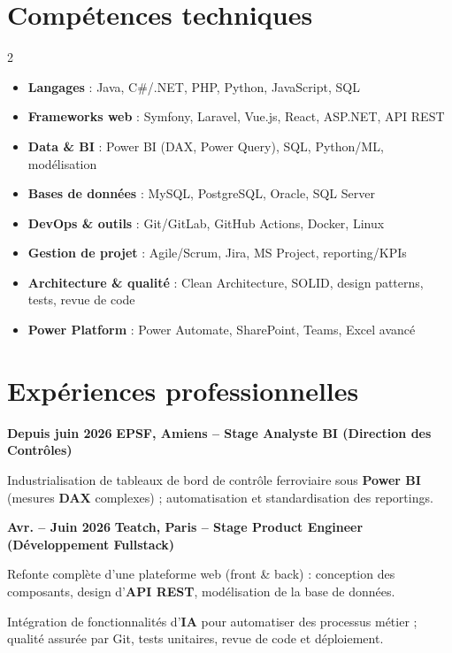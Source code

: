 \documentclass[10pt,a4paper]{article}
\newenvironment{resume_list}{\vspace{-2pt}\begin{itemize}[itemsep=0.3pt,parsep=0pt,topsep=0.3pt,leftmargin=18pt]}{\end{itemize}\vspace{-2pt}}
\newcommand{\heading}[2]{{\raggedright\noindent\textbf{#2} \quad \textbf{#1}\\}}
\begin{document}
\section{Compétences techniques}
\begin{multicols}{2}
\begin{itemize}[itemsep=0.3pt,leftmargin=18pt]
  \item \textbf{Langages} : Java, C\#/.NET, PHP, Python, JavaScript, SQL
  \item \textbf{Frameworks web} : Symfony, Laravel, Vue.js, React, ASP.NET, API REST
  \item \textbf{Data \& BI} : Power BI (DAX, Power Query), SQL, Python/ML, modélisation
  \item \textbf{Bases de données} : MySQL, PostgreSQL, Oracle, SQL Server
  \item \textbf{DevOps \& outils} : Git/GitLab, GitHub Actions, Docker, Linux
  \item \textbf{Gestion de projet} : Agile/Scrum, Jira, MS Project, reporting/KPIs
  \item \textbf{Architecture \& qualité} : Clean Architecture, SOLID, design patterns, tests, revue de code
  \item \textbf{Power Platform} : Power Automate, SharePoint, Teams, Excel avancé
\end{itemize}
\end{multicols}

\section{Expériences professionnelles}

\heading{EPSF, Amiens \textbf{--} Stage Analyste BI (Direction des Contrôles)}{Depuis juin 2026}
\begin{resume_list}
  \item Industrialisation de tableaux de bord de contrôle ferroviaire sous \textbf{Power BI} (mesures \textbf{DAX} complexes) ; automatisation et standardisation des reportings.
\end{resume_list}

\heading{Teatch, Paris \textbf{--} Stage Product Engineer (Développement Fullstack)}{Avr. -- Juin 2026}
\begin{resume_list}
  \item Refonte complète d'une plateforme web (front \& back) : conception des composants, design d'\textbf{API REST}, modélisation de la base de données.
  \item Intégration de fonctionnalités d'\textbf{IA} pour automatiser des processus métier ; qualité assurée par Git, tests unitaires, revue de code et déploiement.
\end{resume_list}
\end{document}
